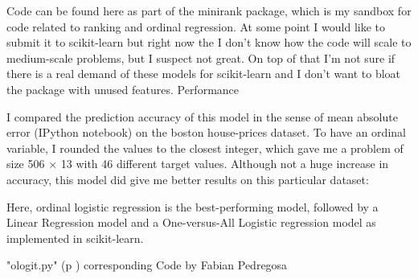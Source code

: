 Code can be found here as part of the minirank package, which is my sandbox for code related to ranking and ordinal regression. At some point I would like to submit it to scikit-learn but right now the I don't know how the code will scale to medium-scale problems, but I suspect not great. On top of that I'm not sure if there is a real demand of these models for scikit-learn and I don't want to bloat the package with unused features.
Performance

I compared the prediction accuracy of this model in the sense of mean absolute error (IPython notebook) on the boston house-prices dataset. To have an ordinal variable, I rounded the values to the closest integer, which gave me a problem of size 506 × 13 with 46 different target values. Although not a huge increase in accuracy, this model did give me better results on this particular dataset:

Here, ordinal logistic regression is the best-performing model, followed by a Linear Regression model and a One-versus-All Logistic regression model as implemented in scikit-learn.

\PyImg "ologit.py" (p \pageref{py:ologit}) corresponding Code by Fabian Pedregosa
